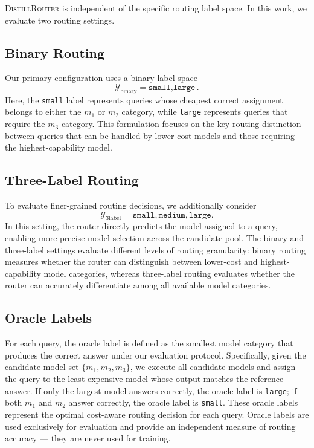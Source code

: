 \documentclass{article}
\begin{document}
\textsc{DistillRouter} is independent of the specific routing label space. In this work, we evaluate two routing settings.

\subsection{Binary Routing}

Our primary configuration uses a binary label space
\[
\mathcal{Y}_{\text{binary}} = {{\texttt{small}, \texttt{large}}}.
\]
Here, the \texttt{small} label represents queries whose cheapest correct assignment belongs to either the $m_1$ or $m_2$ category, while \texttt{large} represents queries that require the $m_3$ category. This formulation focuses on the key routing distinction between queries that can be handled by lower-cost models and those requiring the highest-capability model.

\subsection{Three-Label Routing}

To evaluate finer-grained routing decisions, we additionally consider
\[
\mathcal{Y}_{\text{3label}} = {{\texttt{small}, \texttt{medium}, \texttt{large}}}.
\]
In this setting, the router directly predicts the model assigned to a query, enabling more precise model selection across the candidate pool. The binary and three-label settings evaluate different levels of routing granularity: binary routing measures whether the router can distinguish between lower-cost and highest-capability model categories, whereas three-label routing evaluates whether the router can accurately differentiate among all available model categories.
\subsection{Oracle Labels}
\label{sec:oracle-routing-policy}

For each query, the oracle label is defined as the smallest model category that produces the correct answer under our evaluation protocol. Specifically, given the candidate model set $\{m_1, m_2, m_3\}$, we execute all candidate models and assign the query to the least expensive model whose output matches the reference answer. If only the largest model answers correctly, the oracle label is \texttt{large}; if both $m_1$ and $m_2$ answer correctly, the oracle label is \texttt{small}. These oracle labels represent the optimal cost-aware routing decision for each query. Oracle labels are used exclusively for evaluation and provide an independent measure of routing accuracy — they are never used for training.
\end{document}

